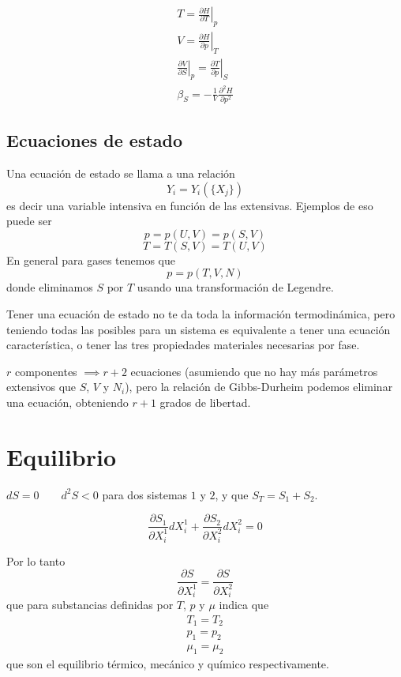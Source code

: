 \documentclass{book}
\numberwithin{equation}{section} %
\begin{document}
\begin{equation}
\begin{gathered}
    T = \left.\frac{\partial H}{\partial T}\right|_p\\
    V = \left.\frac{\partial H}{\partial p}\right|_T\\
    \left.\frac{\partial V}{\partial S}\right|_p = \left.\frac{\partial T}{\partial p}\right|_S\\
    \beta_S = - \frac{1}{V} \frac{\partial^2 H}{\partial p^2}
\end{gathered}
\end{equation}

\subsection{Ecuaciones de estado}
Una ecuación de estado se llama a una relación
\begin{equation}
Y_i = Y_i(\{X_j\})
\end{equation}
es decir una variable intensiva en función de las extensivas.
Ejemplos de eso puede ser
\[p = p(U,V) = p(S,V)\]
\[T = T(S,V) = T(U,V)\]
En general para gases tenemos que
\[p = p(T,V,N)\]
donde eliminamos $S$ por $T$ usando una transformación de Legendre.

Tener una ecuación de estado no te da toda la información termodinámica, pero teniendo todas las posibles para un sistema es equivalente a tener una ecuación característica, o tener las tres propiedades materiales necesarias por fase.

$r$ componentes $\implies r + 2$ ecuaciones (asumiendo que no hay más parámetros extensivos que $S$, $V$ y $N_i$), pero la relación de Gibbs-Durheim podemos eliminar una ecuación, obteniendo $r + 1$ grados de libertad.

\section{Equilibrio}
$dS = 0 \qquad d^2 S < 0$ para dos sistemas $1$ y $2$, y que $S_T = S_1 + S_2$.

\[\frac{\partial S_1}{\partial X^1_i} dX^1_i + \frac{\partial S_2}{\partial X^2_i} dX^2_i = 0\]

Por lo tanto
\begin{equation}
\frac{\partial S}{\partial X^1_i} = \frac{\partial S}{\partial X^2_i}
\end{equation}
que para substancias definidas por $T$, $p$ y $\mu$ indica que
\begin{equation}
\begin{gathered}
T_1 = T_2 \\
p_1 = p_2 \\
\mu_1 = \mu_2
\end{gathered}
\end{equation}
que son el equilibrio térmico, mecánico y químico respectivamente.
\end{document}
